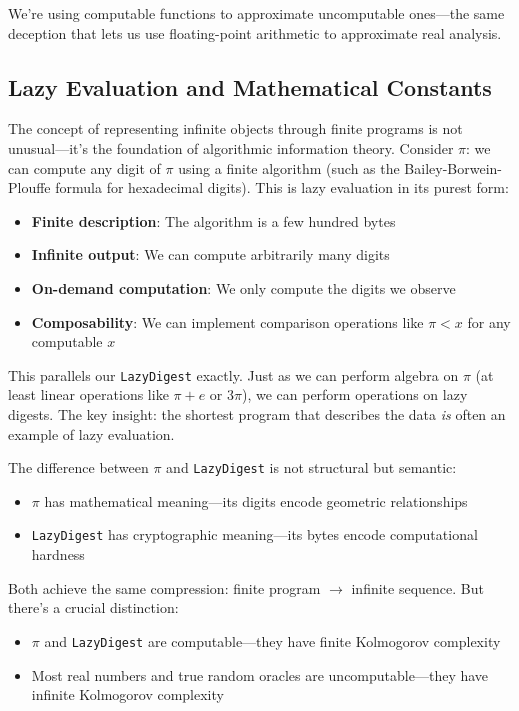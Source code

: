\documentclass[11pt]{article}
\begin{document}
We're using computable functions to approximate uncomputable ones---the same deception that lets us use floating-point arithmetic to approximate real analysis.

\subsection{Lazy Evaluation and Mathematical Constants}

The concept of representing infinite objects through finite programs is not unusual---it's the foundation of algorithmic information theory. Consider $\pi$: we can compute any digit of $\pi$ using a finite algorithm (such as the Bailey-Borwein-Plouffe formula for hexadecimal digits). This is lazy evaluation in its purest form:

\begin{itemize}
\item \textbf{Finite description}: The algorithm is a few hundred bytes
\item \textbf{Infinite output}: We can compute arbitrarily many digits
\item \textbf{On-demand computation}: We only compute the digits we observe
\item \textbf{Composability}: We can implement comparison operations like $\pi < x$ for any computable $x$
\end{itemize}

This parallels our \texttt{LazyDigest} exactly. Just as we can perform algebra on $\pi$ (at least linear operations like $\pi + e$ or $3\pi$), we can perform operations on lazy digests. The key insight: the shortest program that describes the data \emph{is} often an example of lazy evaluation.

The difference between $\pi$ and \texttt{LazyDigest} is not structural but semantic:
\begin{itemize}
\item $\pi$ has mathematical meaning---its digits encode geometric relationships
\item \texttt{LazyDigest} has cryptographic meaning---its bytes encode computational hardness
\end{itemize}

Both achieve the same compression: finite program $\to$ infinite sequence. But there's a crucial distinction:
\begin{itemize}
\item $\pi$ and \texttt{LazyDigest} are computable---they have finite Kolmogorov complexity
\item Most real numbers and true random oracles are uncomputable---they have infinite Kolmogorov complexity
\end{itemize}
\end{document}
